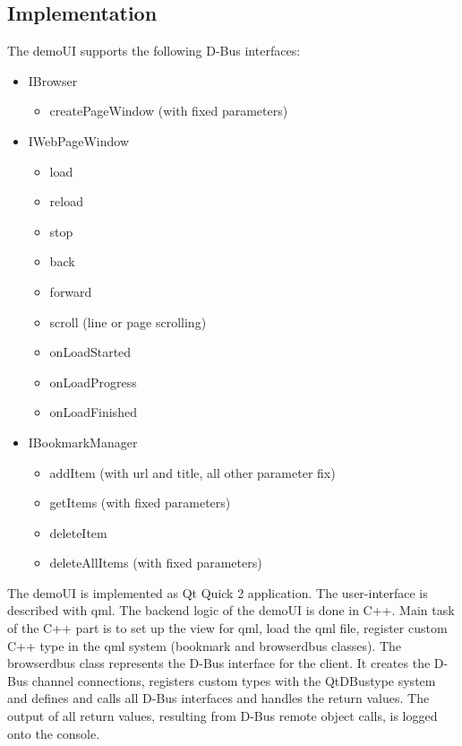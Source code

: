 \documentclass{pelagicore}
\begin{document}
\subsection{Implementation}
The demoUI supports the following D-Bus interfaces:
\begin{itemize}
    \item IBrowser
    \begin{itemize}
        \item createPageWindow (with fixed parameters)
    \end{itemize}
    \item IWebPageWindow
    \begin{itemize}
        \item load
        \item reload
        \item stop
        \item back
        \item forward
        \item scroll (line or page scrolling)
        \item onLoadStarted
        \item onLoadProgress
        \item onLoadFinished
    \end{itemize}
    \item IBookmarkManager
    \begin{itemize}
        \item addItem (with url and title, all other parameter fix)
        \item getItems (with fixed parameters)
        \item deleteItem
        \item deleteAllItems (with fixed parameters)
    \end{itemize}
\end{itemize}

The demoUI is implemented as Qt Quick 2 application. The user-interface is
described with qml. The backend logic of the demoUI is done in C++. Main task
of the C++ part is to set up the view for qml, load the qml file, register
custom C++ type in the qml system (bookmark and browserdbus classes). The
browserdbus class represents the D-Bus interface for the client. It creates the
D-Bus channel connections, registers custom types with the QtDBustype system
and defines and calls all D-Bus interfaces and handles the return values. The
output of all return values, resulting from D-Bus remote object calls, is logged
onto the console.
\end{document}
